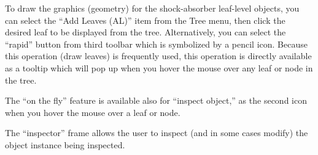 \documentclass [11pt]{book}
\begin{document}
To draw the graphics (geometry) for the shock-absorber
leaf-level objects, you can select the ``Add Leaves (AL)'' item from
the Tree menu, then click the desired leaf to be displayed from the
tree. Alternatively, you can select the ``rapid'' button from third
toolbar which is symbolized by a pencil icon. Because this
operation (draw leaves) is frequently used, this operation is directly
available as a tooltip which will pop up when you hover the mouse over
any leaf or node in the tree.



The ``on the fly'' feature is available also for ``inspect
object,'' as the second icon when you hover the mouse over a leaf or
node.



The ``inspector'' frame allows the user to inspect (and in
some cases modify) the object instance being inspected.
\end{document}
